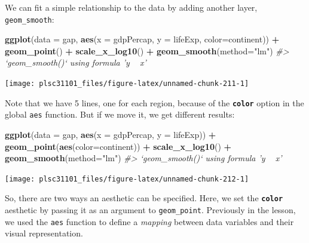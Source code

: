\documentclass[]{book}
\newenvironment{Shaded}{\begin{snugshade}}{\end{snugshade}}
\newcommand{\KeywordTok}[1]{\textcolor[rgb]{0.13,0.29,0.53}{\textbf{#1}}}
\newcommand{\DataTypeTok}[1]{\textcolor[rgb]{0.13,0.29,0.53}{#1}}
\newcommand{\StringTok}[1]{\textcolor[rgb]{0.31,0.60,0.02}{#1}}
\newcommand{\CommentTok}[1]{\textcolor[rgb]{0.56,0.35,0.01}{\textit{#1}}}
\newcommand{\OperatorTok}[1]{\textcolor[rgb]{0.81,0.36,0.00}{\textbf{#1}}}
\newcommand{\NormalTok}[1]{#1}
\begin{document}
We can fit a simple relationship to the data by adding another layer,
\texttt{geom\_smooth}:

\begin{Shaded}
\begin{Highlighting}[]
\KeywordTok{ggplot}\NormalTok{(}\DataTypeTok{data =}\NormalTok{ gap, }\KeywordTok{aes}\NormalTok{(}\DataTypeTok{x =}\NormalTok{ gdpPercap, }\DataTypeTok{y =}\NormalTok{ lifeExp, }\DataTypeTok{color=}\NormalTok{continent)) }\OperatorTok{+}\StringTok{ }
\StringTok{  }\KeywordTok{geom_point}\NormalTok{() }\OperatorTok{+}\StringTok{ }
\StringTok{  }\KeywordTok{scale_x_log10}\NormalTok{() }\OperatorTok{+}\StringTok{ }
\StringTok{  }\KeywordTok{geom_smooth}\NormalTok{(}\DataTypeTok{method=}\StringTok{"lm"}\NormalTok{)}
\CommentTok{#> `geom_smooth()` using formula 'y ~ x'}
\end{Highlighting}
\end{Shaded}

\begin{center}\texttt{[image: plsc31101\_files/figure-latex/unnamed-chunk-211-1]} \end{center}

Note that we have 5 lines, one for each region, because of the
\textbf{\texttt{color}} option in the global \texttt{aes} function. But
if we move it, we get different results:

\begin{Shaded}
\begin{Highlighting}[]
\KeywordTok{ggplot}\NormalTok{(}\DataTypeTok{data =}\NormalTok{ gap, }\KeywordTok{aes}\NormalTok{(}\DataTypeTok{x =}\NormalTok{ gdpPercap, }\DataTypeTok{y =}\NormalTok{ lifeExp)) }\OperatorTok{+}\StringTok{ }
\StringTok{  }\KeywordTok{geom_point}\NormalTok{(}\KeywordTok{aes}\NormalTok{(}\DataTypeTok{color=}\NormalTok{continent)) }\OperatorTok{+}\StringTok{ }
\StringTok{  }\KeywordTok{scale_x_log10}\NormalTok{() }\OperatorTok{+}\StringTok{ }
\StringTok{  }\KeywordTok{geom_smooth}\NormalTok{(}\DataTypeTok{method=}\StringTok{"lm"}\NormalTok{)}
\CommentTok{#> `geom_smooth()` using formula 'y ~ x'}
\end{Highlighting}
\end{Shaded}

\begin{center}\texttt{[image: plsc31101\_files/figure-latex/unnamed-chunk-212-1]} \end{center}

So, there are two ways an aesthetic can be specified. Here, we set the
\textbf{\texttt{color}} aesthetic by passing it as an argument to
\texttt{geom\_point}. Previously in the lesson, we used the \texttt{aes}
function to define a \emph{mapping} between data variables and their
visual representation.
\end{document}
